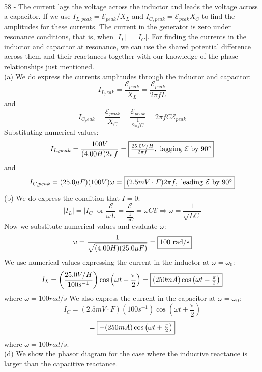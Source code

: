 \documentclass{report}
\begin{document}
\paragraph{}
58 - The current lags the voltage across the inductor and leads the voltage across a capacitor. If we use $I_{L, peak} = \mathcal{E}_{peak} / X_L$ and $I_{C, peak} = \mathcal{E}_{peak}X_C$ to find the amplitudes for these currents. The current in the generator is zero under resonance conditions, that is, when $\lvert I_L \rvert = \lvert I_C \rvert$. For finding the currents in the inductor and capacitor at resonance, we can use the shared potential difference across them and their reactances together with our knowledge of the phase relationships just mentioned.\\
(a) We do express the currents amplitudes through the inductor and capacitor:
$$I_{L_ peak} = \frac{\mathcal{E}_{peak}}{X_L} = \frac{\mathcal{E}_{peak}}{2\pi fL}$$
and
$$I_{C_ peak} = \frac{\mathcal{E}_{peak}}{X_C} = \frac{\mathcal{E}_{peak}}{\frac{1}{2\pi fC}} = 2 \pi fC\mathcal{E}_{peak}$$
Substituting numerical values:
$$I_{L, peak} = \frac{100V}{(4.00H)2 \pi f} = \fbox{$\frac{25.0V/H}{2 \pi f}, \text{ lagging } \mathcal{E} \text{ by } 90^{\circ}$}$$
and
$$I_{C, peak} = (25.0 \mu F)(100V) \omega = \fbox{$(2.5mV \cdot F)2 \pi f, \text{ leading } \mathcal{E} \text{ by } 90^{\circ}$}$$
(b) We do express the condition that $I = 0$:
$$\lvert I_L \rvert = \lvert I_C \rvert \text{ or } \frac{\mathcal{E}}{\omega L} = \frac{\mathcal{E}}{\frac{1}{\omega C}} = \omega C\mathcal{E} \Rightarrow \omega = \frac{1}{\sqrt{LC}}$$
Now we substitute numerical values and evaluate $\omega$:
$$\omega = \frac{1}{\sqrt{(4.00H)(25.0 \mu F)}} = \fbox{100 rad/s}$$
We use numerical values expressing the current in the inductor at $\omega = \omega_0$:
$$I_L = \left( \frac{25.0V/H}{100s^{-1}} \right) \cos \left( \omega t - \frac{\pi}{2} \right) = \fbox{$(250mA) \cos \left( \omega t - \frac{\pi}{2} \right)$}$$
where $\omega = 100 rad / s$
We also express the current in the capacitor at $\omega = \omega_0$:
$$I_C = (2.5mV \cdot F)(100s^{-1}) \cos \left( \omega t + \frac{\pi}{2} \right)$$
$$= \fbox{$-(250mA) \cos \left( \omega t + \frac{\pi}{2} \right)$}$$
where $\omega = 100 rad / s$.\\
(d) We show the phasor diagram for the case where the inductive reactance is larger than the capacitive reactance.
\end{document}
